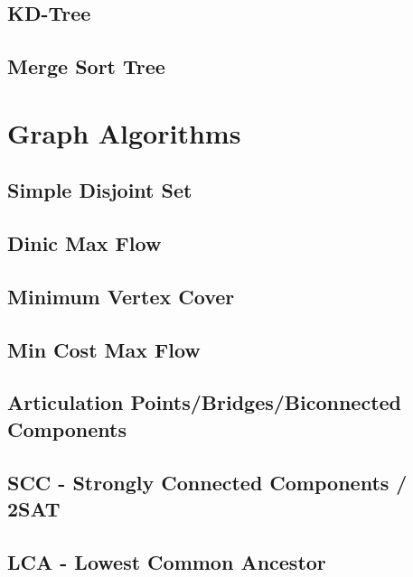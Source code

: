 \subsection{KD-Tree}
\raggedbottom
\hrulefill
\subsection{Merge Sort Tree}
\raggedbottom
\hrulefill

\section{Graph Algorithms}
\subsection{Simple Disjoint Set}
\raggedbottom
\hrulefill
\subsection{	Dinic Max Flow}
\raggedbottom
\hrulefill
\subsection{Minimum Vertex Cover}
\raggedbottom
\hrulefill
\subsection{Min Cost Max Flow}
\raggedbottom
\hrulefill
\subsection{Articulation Points/Bridges/Biconnected Components}
\raggedbottom
\hrulefill
\subsection{SCC - Strongly Connected Components / 2SAT}
\raggedbottom
\hrulefill
\subsection{LCA - Lowest Common Ancestor}
\raggedbottom
\hrulefill
